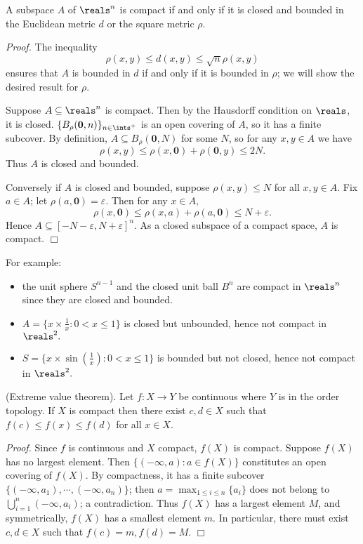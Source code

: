 \begin{theorem}\label{3.36}
    A subspace $A$ of $\reals^n$ is compact if and only if it is closed and bounded in the Euclidean metric $d$ or the square metric $\rho.$
\end{theorem}
{\it Proof.} The inequality
$$\rho(x, y) \leq d(x, y) \leq \sqrt{n}\rho(x, y)$$
ensures that $A$ is bounded in $d$ if and only if it is bounded in $\rho$; we will show the desired result for $\rho.$

Suppose $A \subseteq \reals^n$ is compact. Then by the Hausdorff condition on $\reals$, it is closed. $\{B_\rho(\mathbf{0}, n)\}_{n \in \ints^+}$ is an open covering of $A$, so it has a finite subcover. By definition, $A \subseteq B_\rho(\mathbf{0}, N)$ for some $N$, so for any $x, y\in A$ we have 
$$\rho(x, y) \leq \rho(x, \mathbf{0}) + \rho(\mathbf{0}, y) \leq 2N.$$
Thus $A$ is closed and bounded.

Conversely if $A$ is closed and bounded, suppose $\rho(x, y) \leq N$ for all $x, y \in A.$ Fix $a \in A$; let $\rho(a, \mathbf{0}) = \varepsilon.$ Then for any $x \in A,$
$$\rho(x, \mathbf{0}) \leq \rho(x, a) + \rho(a, \mathbf{0}) \leq N + \varepsilon.$$
Hence $A \subseteq [-N-\varepsilon, N+\varepsilon]^n.$ As a closed subspace of a compact space, $A$ is compact. $\Box$

For example:
\begin{itemize}
    \item the unit sphere $S^{n-1}$ and the closed unit ball $B^n$ are compact in $\reals^n$ since they are closed and bounded.
    \item $A = \{x \times \frac1x: 0 < x \leq 1\}$ is closed but unbounded, hence not compact in $\reals^2.$
    \item $S = \{x \times \sin \left(\frac1x\right): 0 < x \leq 1\}$ is bounded but not closed, hence not compact in $\reals^2.$
\end{itemize}
\begin{theorem}\label{3.37}
    (Extreme value theorem). Let $f: X \rightarrow Y$ be continuous where $Y$ is in the order topology. If $X$ is compact then there exist $c, d \in X$ such that $f(c) \leq f(x) \leq f(d)$ for all $x \in X.$
\end{theorem}
{\it Proof.} Since $f$ is continuous and $X$ compact, $f(X)$ is compact. Suppose $f(X)$ has no largest element. Then $\{(-\infty, a): a \in f(X)\}$ constitutes an open covering of $f(X).$ By compactness, it has a finite subcover $\{(-\infty, a_1), \cdots, (-\infty, a_n)\}$; then $a = \max_{1 \leq i \leq n} \{a_i\}$ does not belong to $\bigcup_{i=1}^n (-\infty, a_i)$; a contradiction. Thus $f(X)$ has a largest element $M$, and symmetrically, $f(X)$ has a smallest element $m$. In particular, there must exist $c, d \in X$ such that $f(c) = m, f(d) = M.$ $\Box$

